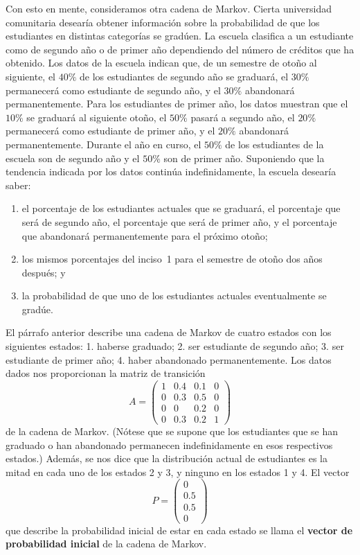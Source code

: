 \documentclass[12pt,a4paper]{book}
\begin{document}
    Con esto en mente, consideramos otra cadena de Markov. Cierta universidad comunitaria desearía obtener información sobre la probabilidad de que los estudiantes en distintas categorías se gradúen. La escuela clasifica a un estudiante como de segundo año o de primer año dependiendo del número de créditos que ha obtenido. Los datos de la escuela indican que, de un semestre de otoño al siguiente, el $40\%$ de los estudiantes de segundo año se graduará, el $30\%$ permanecerá como estudiante de segundo año, y el $30\%$ abandonará permanentemente. Para los estudiantes de primer año, los datos muestran que el $10\%$ se graduará al siguiente otoño, el $50\%$ pasará a segundo año, el $20\%$ permanecerá como estudiante de primer año, y el $20\%$ abandonará permanentemente. Durante el año en curso, el $50\%$ de los estudiantes de la escuela son de segundo año y el $50\%$ son de primer año. Suponiendo que la tendencia indicada por los datos continúa indefinidamente, la escuela desearía saber:
    \begin{enumerate}
        \item el porcentaje de los estudiantes actuales que se graduará, el porcentaje que será de segundo año, el porcentaje que será de primer año, y el porcentaje que abandonará permanentemente para el próximo otoño;
        \item los mismos porcentajes del inciso~1 para el semestre de otoño dos años después; y
        \item la probabilidad de que uno de los estudiantes actuales eventualmente se gradúe.
    \end{enumerate}

    El párrafo anterior describe una cadena de Markov de cuatro estados con los siguientes estados: 1. haberse graduado; 2. ser estudiante de segundo año; 3. ser estudiante de primer año; 4. haber abandonado permanentemente. Los datos dados nos proporcionan la matriz de transición
    \begin{equation*}
        A=\begin{pmatrix}1&0.4&0.1&0\\0&0.3&0.5&0\\0&0&0.2&0\\0&0.3&0.2&1\end{pmatrix}
    \end{equation*}
    de la cadena de Markov. (Nótese que se supone que los estudiantes que se han graduado o han abandonado permanecen indefinidamente en esos respectivos estados.) Además, se nos dice que la distribución actual de estudiantes es la mitad en cada uno de los estados 2 y 3, y ninguno en los estados 1 y 4. El vector
    \begin{equation*}
        P=\begin{pmatrix}0\\0.5\\0.5\\0\end{pmatrix}
    \end{equation*}
    que describe la probabilidad inicial de estar en cada estado se llama el \textbf{vector de probabilidad inicial} de la cadena de Markov.
\end{document}
